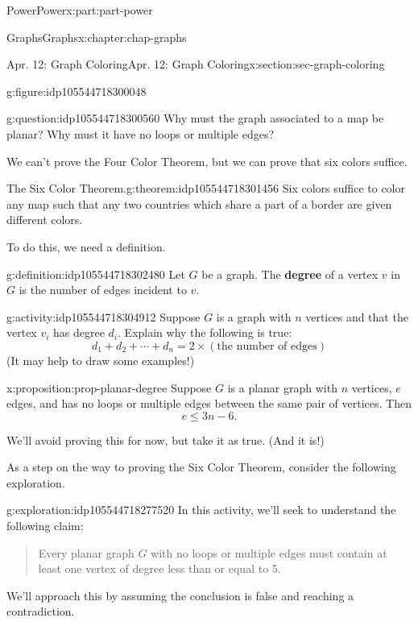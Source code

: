 \documentclass[oneside,10pt,]{book}
\newcommand{\terminology}[1]{\textbf{#1}}
\numberwithin{equation}{section}
\renewcommand{\le}{\leqslant}
\begin{document}
\begin{partptx}{Power}{}{Power}{}{}{x:part:part-power}
\begin{chapterptx}{Graphs}{}{Graphs}{}{}{x:chapter:chap-graphs}
\begin{sectionptx}{Apr. 12: Graph Coloring}{}{Apr. 12: Graph Coloring}{}{}{x:section:sec-graph-coloring}
\begin{figureptx}{}{g:figure:idp105544718300048}{}
\tcblower
\end{figureptx}%
\begin{question}{}{g:question:idp105544718300560}%
Why must the graph associated to a map be planar? Why must it have no loops or multiple edges?%
\end{question}
We can't prove the Four Color Theorem, but we can prove that six colors suffice.%
\begin{theorem}{The Six Color Theorem.}{}{g:theorem:idp105544718301456}%
Six colors suffice to color any map such that any two countries which share a part of a border are given different colors.%
\end{theorem}
To do this, we need a definition.%
\begin{definition}{}{g:definition:idp105544718302480}%
Let \(G\) be a graph. The \terminology{degree} of a vertex \(v\) in \(G\) is the number of edges incident to \(v\).%
\end{definition}
\begin{activity}{}{g:activity:idp105544718304912}%
Suppose \(G\) is a graph with \(n\) vertices and that the vertex \(v_i\) has degree \(d_i\). Explain why the following is true:%
\begin{equation*}
d_1 + d_2 + \cdots + d_n = 2\times (\text{the number of edges})
\end{equation*}
(It may help to draw some examples!)%
\end{activity}%
\begin{proposition}{}{}{x:proposition:prop-planar-degree}%
Suppose \(G\) is a planar graph with \(n\) vertices, \(e\) edges, and has no loops or multiple edges between the same pair of vertices. Then%
\begin{equation*}
e \le 3n - 6.
\end{equation*}
%
\end{proposition}
We'll avoid proving this for now, but take it as true. (And it is!)%
\par
As a step on the way to proving the Six Color Theorem, consider the following exploration.%
\begin{exploration}{}{g:exploration:idp105544718277520}%
In this activity, we'll seek to understand the following claim: \begin{quote}%
Every planar graph \(G\) with no loops or multiple edges must contain at least one vertex of degree less than or equal to 5.\end{quote}
 We'll approach this by assuming the conclusion is false and reaching a contradiction.%
%
\begin{itemize}[label=\textbullet]

\end{itemize}
\end{exploration}
\end{sectionptx}
\end{chapterptx}
\end{partptx}
\end{document}
